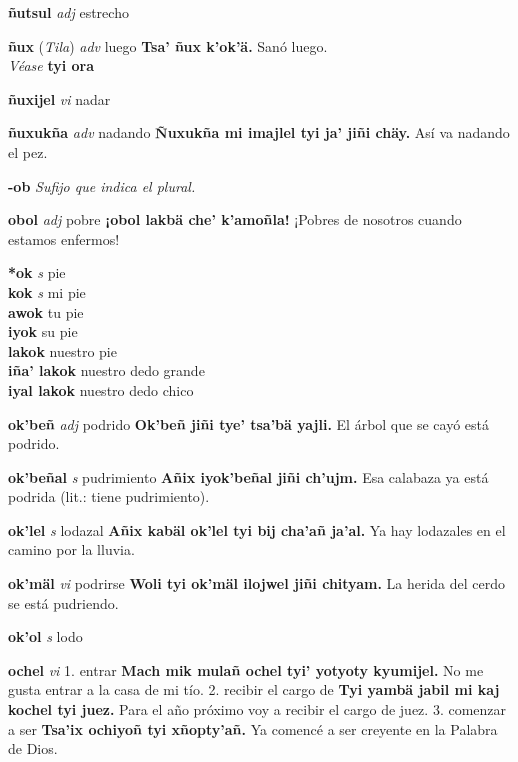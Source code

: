 \documentclass[10pt]{scrbook}
\newcommand{\entry}[1]{\textbf{#1}}
\newcommand{\alphaletter}[1]{\end{multicols}\addsec{#1}\begin{multicols}{2}}
\newcommand{\onedefinition}[1]{#1.}
\newcommand{\nontranslationdef}[1]{\textit{#1}}
\newcommand{\partofspeech}[1]{\textit{#1}}
\newcommand{\spanishtranslation}[1]{#1}
\newcommand{\cholexample}[1]{\textbf{#1}}
\newcommand{\exampletranslation}[1]{#1}
\newcommand{\alsosee}[1]{\\\textit{Véase} \textbf{#1}}
\newcommand{\relevantdialect}[1]{(\textit{#1})}
\newcommand{\secondaryentry}[1]{\\\textbf{#1}}
\newcommand{\secondpartofspeech}[1]{\textit{#1}}
\newcommand{\secondtranslation}[1]{#1}
\begin{document}
\begin{multicols}{2}
\entry{ñutsul}
\partofspeech{adj}
\spanishtranslation{estrecho}

\entry{ñux}
\relevantdialect{Tila}
\partofspeech{adv}
\spanishtranslation{luego}
\cholexample{Tsa' ñux k'ok'ä.}
\exampletranslation{Sanó luego.}
\alsosee{tyi ora}

\entry{ñuxijel}
\partofspeech{vi}
\spanishtranslation{nadar}

\entry{ñuxukña}
\partofspeech{adv}
\spanishtranslation{nadando}
\cholexample{Ñuxukña mi imajlel tyi ja' jiñi chäy.}
\exampletranslation{Así va nadando el pez.}

\alphaletter{O}

\entry{-ob}
\nontranslationdef{Sufijo que indica el plural.}

\entry{obol}
\partofspeech{adj}
\spanishtranslation{pobre}
\cholexample{¡obol lakbä che' k'amoñla!}
\exampletranslation{¡Pobres de nosotros cuando estamos enfermos!}

\entry{*ok}
\partofspeech{s}
\spanishtranslation{pie}
\secondaryentry{kok}
\secondpartofspeech{s}
\secondtranslation{mi pie}
\secondaryentry{awok}
\secondtranslation{tu pie}
\secondaryentry{iyok}
\secondtranslation{su pie}
\secondaryentry{lakok}
\secondtranslation{nuestro pie}
\secondaryentry{iña' lakok}
\secondtranslation{nuestro dedo grande}
\secondaryentry{iyal lakok}
\secondtranslation{nuestro dedo chico}

\entry{ok'beñ}
\partofspeech{adj}
\spanishtranslation{podrido}
\cholexample{Ok'beñ jiñi tye' tsa'bä yajli.}
\exampletranslation{El árbol que se cayó está podrido.}

\entry{ok'beñal}
\partofspeech{s}
\spanishtranslation{pudrimiento}
\cholexample{Añix iyok'beñal jiñi ch'ujm.}
\exampletranslation{Esa calabaza ya está podrida (lit.: tiene pudrimiento).}

\entry{ok'lel}
\partofspeech{s}
\spanishtranslation{lodazal}
\cholexample{Añix kabäl ok'lel tyi bij cha'añ ja'al.}
\exampletranslation{Ya hay lodazales en el camino por la lluvia.}

\entry{ok'mäl}
\partofspeech{vi}
\spanishtranslation{podrirse}
\cholexample{Woli tyi ok'mäl ilojwel jiñi chityam.}
\exampletranslation{La herida del cerdo se está pudriendo.}

\entry{ok'ol}
\partofspeech{s}
\spanishtranslation{lodo}

\entry{ochel}
\partofspeech{vi}
\onedefinition{1}
\spanishtranslation{entrar}
\cholexample{Mach mik mulañ ochel tyi' yotyoty kyumijel.}
\exampletranslation{No me gusta entrar a la casa de mi tío.}
\onedefinition{2}
\spanishtranslation{recibir el cargo de}
\cholexample{Tyi yambä jabil mi kaj kochel tyi juez.}
\exampletranslation{Para el año próximo voy a recibir el cargo de juez.}
\onedefinition{3}
\spanishtranslation{comenzar a ser}
\cholexample{Tsa'ix ochiyoñ tyi xñopty'añ.}
\exampletranslation{Ya comencé a ser creyente en la Palabra de Dios.}


\end{multicols}
\end{document}

